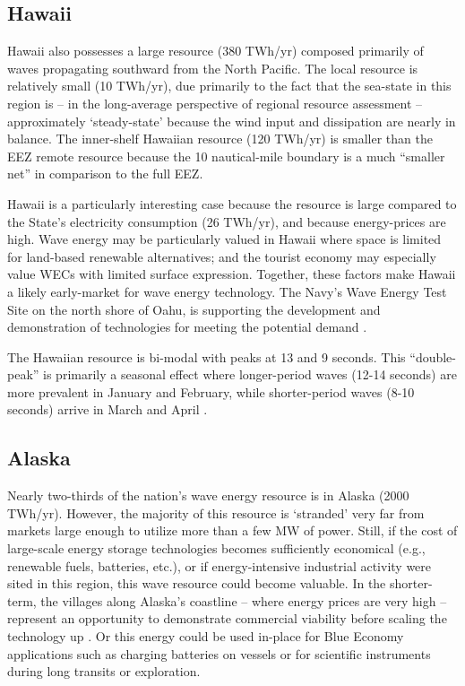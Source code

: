 \subsection{Hawaii}

Hawaii also possesses a large resource (380 TWh/yr) composed primarily of waves propagating southward from the North Pacific. The local resource is relatively small (10 TWh/yr), due primarily to the fact that the sea-state in this region is -- in the long-average perspective of regional resource assessment -- approximately `steady-state' because the wind input and dissipation are nearly in balance. The inner-shelf Hawaiian resource (120 TWh/yr) is smaller than the EEZ remote resource because the 10 nautical-mile boundary is a much ``smaller net'' in comparison to the full EEZ.

Hawaii is a particularly interesting case because the resource is large compared to the State's electricity consumption (26 TWh/yr), and because energy-prices are high. Wave energy may be particularly valued in Hawaii where space is limited for land-based renewable alternatives; and the tourist economy may especially value WECs with limited surface expression. Together, these factors make Hawaii a likely early-market for wave energy technology. The Navy's Wave Energy Test Site on the north shore of Oahu, is supporting the development and demonstration of technologies for meeting the potential demand \citep{crossEarlyResearchEfforts2015}.

The Hawaiian resource is bi-modal with peaks at 13 and 9 seconds. This ``double-peak'' is primarily a seasonal effect where longer-period waves (12-14 seconds) are more prevalent in January and February, while shorter-period waves (8-10 seconds) arrive in March and April \citep[][]{stopa2013wave}. 

\subsection{Alaska}

Nearly two-thirds of the nation's wave energy resource is in Alaska (2000 TWh/yr). However, the majority of this resource is `stranded' very far from markets large enough to utilize more than a few MW of power. Still, if the cost of large-scale energy storage technologies becomes sufficiently economical (e.g., renewable fuels, batteries, etc.), or if energy-intensive industrial activity were sited in this region, this wave resource could become valuable. In the shorter-term, the villages along Alaska's coastline -- where energy prices are very high -- represent an opportunity to demonstrate commercial viability before scaling the technology up \citep{alaskaenergyauthority2019PowerCost2020}. Or this energy could be used in-place for Blue Economy applications such as charging batteries on vessels or for scientific instruments during long transits or exploration. 


